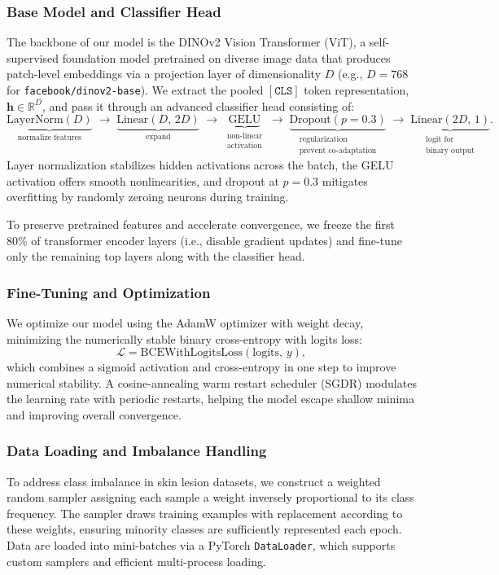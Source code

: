 \subsubsection{Base Model and Classifier Head}
The backbone of our model is the DINOv2 Vision Transformer (ViT), a self-supervised foundation model pretrained on diverse image data that produces patch-level embeddings via a projection layer of dimensionality \(D\) (e.g., \(D = 768\) for \texttt{facebook/dinov2-base}).  We extract the pooled \([\mathtt{CLS}]\) token representation, \(\mathbf{h}\in\mathbb{R}^D\), and pass it through an advanced classifier head consisting of:
\[
\underbrace{\mathrm{LayerNorm}(D)}_{\text{normalize features}} \;\to\;
\underbrace{\mathrm{Linear}(D,\,2D)}_{\text{expand}} \;\to\;
\underbrace{\mathrm{GELU}}_{\substack{\text{non-linear}\\\text{activation}}}
\;\to\;
\underbrace{\mathrm{Dropout}(p=0.3)}_{\substack{\text{regularization}\\\text{prevent co-adaptation}}}
\;\to\;
\underbrace{\mathrm{Linear}(2D,\,1)}_{\substack{\text{logit for}\\\text{binary output}}}.
\] 
Layer normalization stabilizes hidden activations across the batch, the GELU activation offers smooth nonlinearities, and dropout at \(p=0.3\) mitigates overfitting by randomly zeroing neurons during training.

To preserve pretrained features and accelerate convergence, we freeze the first 80\% of transformer encoder layers (i.e., disable gradient updates) and fine-tune only the remaining top layers along with the classifier head.

\subsubsection{Fine-Tuning and Optimization}
We optimize our model using the AdamW optimizer with weight decay, minimizing the numerically stable binary cross-entropy with logits loss:
\[
\mathcal{L} = \mathrm{BCEWithLogitsLoss}(\mathrm{logits},\,y),
\]
which combines a sigmoid activation and cross-entropy in one step to improve numerical stability. A cosine-annealing warm restart scheduler (SGDR) modulates the learning rate with periodic restarts, helping the model escape shallow minima and improving overall convergence.

\subsubsection{Data Loading and Imbalance Handling}
To address class imbalance in skin lesion datasets, we construct a weighted random sampler assigning each sample a weight inversely proportional to its class frequency. The sampler draws training examples with replacement according to these weights, ensuring minority classes are sufficiently represented each epoch. Data are loaded into mini-batches via a PyTorch \texttt{DataLoader}, which supports custom samplers and efficient multi-process loading.

